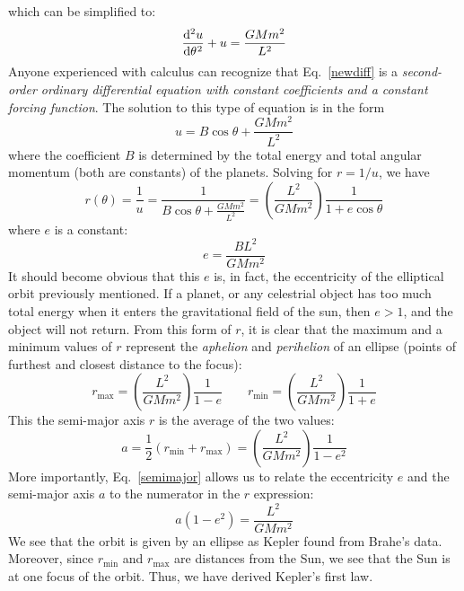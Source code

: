 \documentclass{../../../oss-handout}
\begin{document}
which can be simplified to:
\begin{equation}
  \diff[2]u\theta + u = \frac{GMm^2}{L^2}
  \label{newdiff}
\end{equation}
Anyone experienced with calculus can recognize that Eq.\ \ref{newdiff} is a
\emph{second-order ordinary differential equation with constant coefficients
  and a constant forcing function}. The solution to this type of equation is in
the form
\begin{equation} 
  u =B\cos\theta + \frac{GMm^2}{L^2}
\end{equation}
where the coefficient $B$ is determined by the total energy and total angular
momentum (both are constants) of the planets. Solving for $r=1/u$, we have
\begin{equation}
  r(\theta)=\frac1u = \frac1{B\cos\theta+ \frac{GMm^2}{L^2}}
  =\left(\frac{L^2}{GMm^2}\right)\frac1{1+e\cos\theta}
\end{equation}
where $e$ is a constant:
\begin{equation}
  e=\dfrac{BL^2}{GMm^2}
\end{equation}
It should become obvious that this $e$ is, in fact, the eccentricity of the
elliptical orbit previously mentioned. If a planet, or any celestrial object
has too much total energy when it enters the gravitational field of the sun,
then $e>1$, and the object will not return.
From this form of $r$, it is clear that the maximum and a
minimum values of $r$ represent the \emph{aphelion} and \emph{perihelion} of
an ellipse (points of furthest and closest distance to the focus):
\begin{equation}
  r_\text{max}=\left(\frac{L^2}{GMm^2}\right)\frac1{1-e}
  \quad\quad
  r_\text{min}=\left(\frac{L^2}{GMm^2}\right)\frac1{1+e}
\end{equation}
This the semi-major axis $r$ is the average of the two values:
\begin{equation}
  a=\dfrac12\left(r_\text{min} + r_\text{max}\right)=
  \left(\frac{L^2}{GMm^2}\right)\frac1{1-e^2}
  \label{semimajor}
\end{equation}
More importantly, Eq.\ \ref{semimajor} allows us to relate the eccentricity
$e$ and the semi-major axis $a$ to the numerator in the $r$ expression:
\begin{equation}
  a(1-e^2)=\frac{L^2}{GMm^2}
  \label{eq:numerator}
\end{equation}
We see that the orbit is given by an ellipse as Kepler found from Brahe's
data. Moreover, since $r_\mathrm{min}$ and $r_\mathrm{max}$ are distances from
the Sun, we see that the Sun is at one focus of the orbit. Thus, we have
derived Kepler's first law.
\end{document}
